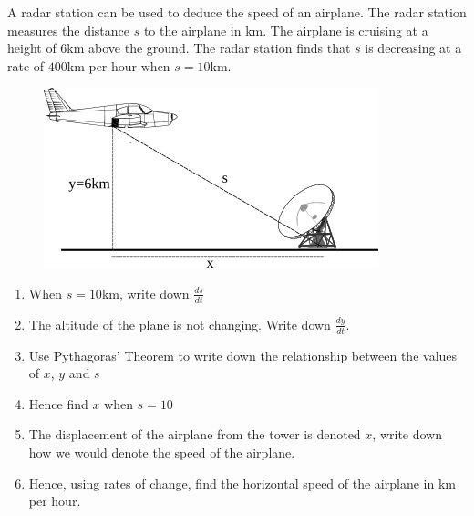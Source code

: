 A radar station can be used to deduce the speed of an airplane. The radar station measures the distance $s$ to the airplane in km. The airplane is cruising at a height of 6km above the ground. The radar station finds that $s$ is decreasing at a rate of $400$km per hour when $s=10$km.
\begin{figure}[H]
	\centering
	\includegraphics{plane_radar1}
\end{figure}
\begin{enumerate}
	\item When $s=10$km, write down $\frac{ds}{dt}$
	\item The altitude of the plane is not changing. Write down $\frac{dy}{dt}$.
	\item Use Pythagoras' Theorem to write down the relationship between the values of $x$, $y$ and $s$
	\item Hence find $x$ when $s=10$
	\item The displacement of the airplane from the tower is denoted $x$, write down how we would denote the speed of the airplane.
	\item Hence, using rates of change, find the horizontal speed of the airplane in km per hour.
\end{enumerate}
